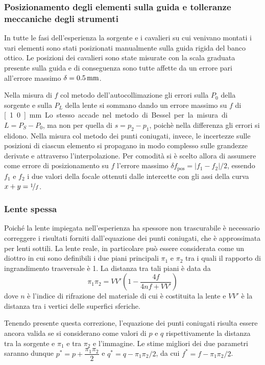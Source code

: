 \documentclass[italian,a4paper]{article}
\begin{document}
\subsubsection*{Posizionamento degli elementi sulla guida e tolleranze meccaniche degli strumenti}
In tutte le fasi dell'esperienza la sorgente e i cavalieri su cui venivano montati i vari elementi sono stati posizionati manualmente sulla guida rigida del banco ottico. Le posizioni dei cavalieri sono state misurate con la scala graduata presente sulla guida e di conseguenza sono tutte affette da un errore pari all'errore massimo $\delta=\unit[0.5]{mm}$.

Nella misura di $f$ col metodo dell'autocollimazione gli errori sulla $P_0$ della sorgente e sulla $P_L$ della lente si sommano dando un errore massimo su $f$ di \unit[1.0]{mm}. Lo stesso accade nel metodo di Bessel per la misura di $L=P_S-P_0$, ma non per quella di $s=p_2-p_1$, poichè nella differenza gli errori si elidono. Nella misura col metodo dei punti coniugati, invece, le incertezze sulle posizioni di ciascun elemento si propagano in modo complesso sulle grandezze derivate e attraverso l'interpolazione. Per comodità si è scelto allora di assumere come errore di posizionamento su $f$ l'errore massimo $\delta f_{\text{pos}}= |f_1-f_2|/2$, essendo $f_1$ e $f_2$ i due valori della focale ottenuti dalle intercette con gli assi della curva $x+y=\nicefrac{1}{f}$.
\subsubsection*{Lente spessa}
Poiché la lente impiegata nell'esperienza ha spessore non trascurabile è necessario correggere i risultati forniti dall'equazione dei punti coniugati, che è approssimata per lenti sottili. La lente reale, in particolare può essere considerata come un diottro in cui sono definibili i due piani principali $\pi_1$ e $\pi_2$ tra i quali il rapporto di ingrandimento trasversale è 1. La distanza tra tali piani è data da 
$$\pi_1\pi_2 = VV'\left(1-\dfrac{4f}{4nf+VV'}\right)$$
dove $n$ è l'indice di rifrazione del materiale di cui è costituita la lente e $VV'$ è la distanza tra i vertici delle superfici sferiche.

Tenendo presente questa correzione, l'equazione dei punti coniugati risulta essere ancora valida se si considerano come valori di $p$ e $q$ rispettivamente la distanza tra la sorgente e $\pi_1$ e tra $\pi_2$ e l'immagine. Le stime migliori dei due parametri saranno dunque $p^*=p+\dfrac{\pi_1\pi_2}{2}$ e $q^*=q-\pi_1\pi_2/2$, da cui $f^*=f-{\pi_1\pi_2}/{2}$.
\end{document}
